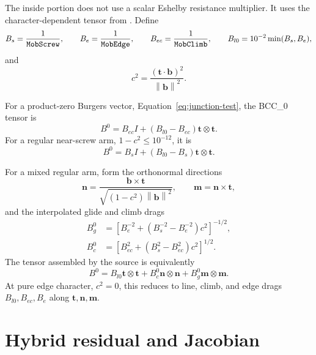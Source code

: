 \documentclass[11pt]{article}
\newcommand{\vect}[1]{\bm{#1}}
\newcommand{\norm}[1]{\left\lVert #1\right\rVert}
\newcommand{\dyad}[2]{#1\!\otimes\!#2}
\newcommand{\code}[1]{\texttt{\detokenize{#1}}}
\begin{document}
The inside portion does not use a scalar Eshelby resistance multiplier.  It
uses the character-dependent tensor from .  Define
\begin{equation}
 B_s=\frac1{\code{MobScrew}},\qquad
 B_e=\frac1{\code{MobEdge}},\qquad
 B_{ec}=\frac1{\code{MobClimb}},\qquad
 B_{l0}=10^{-2}\min(B_s,B_e),
 \label{eq:bcc0-coeffs}
\end{equation}
and
\begin{equation}
 c^2=\frac{(\vect{t}\mathbin{\cdot}\vect{b})^2}{\norm{\vect{b}}^2}.
 \label{eq:character}
\end{equation}

For a product-zero Burgers vector, Equation~\eqref{eq:junction-test}, the
BCC\_0 tensor is
\begin{equation}
 \boxed{B^0=B_{ec}I+(B_{l0}-B_{ec})
 \dyad{\vect{t}}{\vect{t}}.}
 \label{eq:bcc0-special}
\end{equation}
For a regular near-screw arm, \(1-c^2\leq10^{-12}\), it is
\begin{equation}
 \boxed{B^0=B_sI+(B_{l0}-B_s)\dyad{\vect{t}}{\vect{t}}.}
 \label{eq:bcc0-screw}
\end{equation}

For a mixed regular arm, form the orthonormal directions
\begin{equation}
 \vect{n}=\frac{\vect{b}\times\vect{t}}
 {\sqrt{(1-c^2)\norm{\vect{b}}^2}},
 \qquad \vect{m}=\vect{n}\times\vect{t},
 \label{eq:bcc0-basis}
\end{equation}
and the interpolated glide and climb drags
\begin{align}
 B_g^0&=\left[B_e^{-2}+(B_s^{-2}-B_e^{-2})c^2\right]^{-1/2},
 \label{eq:bcc0-glide}\\
 B_c^0&=\left[B_{ec}^{2}+(B_s^{2}-B_{ec}^{2})c^2\right]^{1/2}.
 \label{eq:bcc0-climb}
\end{align}
The tensor assembled by the source is equivalently
\begin{equation}
 \boxed{B^0=B_{l0}\dyad{\vect{t}}{\vect{t}}
             +B_c^0\dyad{\vect{n}}{\vect{n}}
             +B_g^0\dyad{\vect{m}}{\vect{m}}.}
 \label{eq:bcc0-mixed}
\end{equation}
At pure edge character, \(c^2=0\), this reduces to line, climb, and edge
drags \(B_{l0},B_{ec},B_e\) along \(\vect{t},\vect{n},\vect{m}\).

\section{Hybrid residual and Jacobian}
\end{document}
